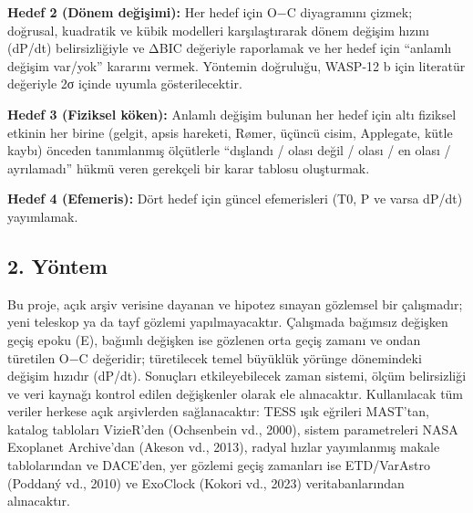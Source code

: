 \textbf{Hedef 2 (Dönem değişimi):} Her hedef için O−C diyagramını çizmek; doğrusal, kuadratik ve kübik modelleri karşılaştırarak dönem değişim hızını (dP/dt) belirsizliğiyle ve ΔBIC değeriyle raporlamak ve her hedef için “anlamlı değişim var/yok” kararını vermek. Yöntemin doğruluğu, WASP-12 b için literatür değeriyle 2σ içinde uyumla gösterilecektir.

\textbf{Hedef 3 (Fiziksel köken):} Anlamlı değişim bulunan her hedef için altı fiziksel etkinin her birine (gelgit, apsis hareketi, Rømer, üçüncü cisim, Applegate, kütle kaybı) önceden tanımlanmış ölçütlerle “dışlandı / olası değil / olası / en olası / ayrılamadı” hükmü veren gerekçeli bir karar tablosu oluşturmak.

\textbf{Hedef 4 (Efemeris):} Dört hedef için güncel efemerisleri (T0, P ve varsa dP/dt) yayımlamak.

\subsection*{2. Yöntem}
Bu proje, açık arşiv verisine dayanan ve hipotez sınayan gözlemsel bir çalışmadır; yeni teleskop ya da tayf gözlemi yapılmayacaktır. Çalışmada bağımsız değişken geçiş epoku (E), bağımlı değişken ise gözlenen orta geçiş zamanı ve ondan türetilen O−C değeridir; türetilecek temel büyüklük yörünge dönemindeki değişim hızıdır (dP/dt). Sonuçları etkileyebilecek zaman sistemi, ölçüm belirsizliği ve veri kaynağı kontrol edilen değişkenler olarak ele alınacaktır. Kullanılacak tüm veriler herkese açık arşivlerden sağlanacaktır: TESS ışık eğrileri MAST'tan, katalog tabloları VizieR'den (Ochsenbein vd., 2000), sistem parametreleri NASA Exoplanet Archive'dan (Akeson vd., 2013), radyal hızlar yayımlanmış makale tablolarından ve DACE'den, yer gözlemi geçiş zamanları ise ETD/VarAstro (Poddaný vd., 2010) ve ExoClock (Kokori vd., 2023) veritabanlarından alınacaktır.

